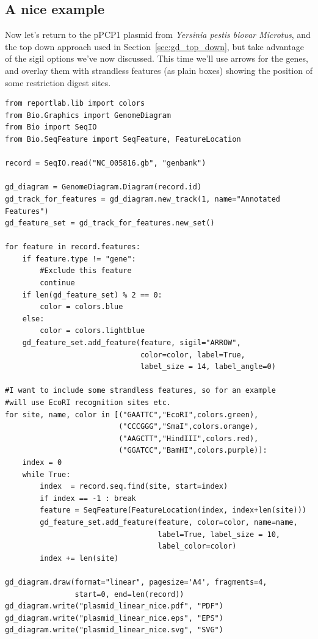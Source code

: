 \documentclass{report}
\begin{document}
\subsection{A nice example}
\label{sec:gd_nice_example}

Now let's return to the pPCP1 plasmid from \textit{Yersinia pestis biovar
Microtus}, and the top down approach used in Section~\ref{sec:gd_top_down},
but take advantage of the sigil options we've now discussed.  This time
we'll use arrows for the genes, and overlay them with strandless features
(as plain boxes) showing the position of some restriction digest sites.

\begin{verbatim}
from reportlab.lib import colors
from Bio.Graphics import GenomeDiagram
from Bio import SeqIO
from Bio.SeqFeature import SeqFeature, FeatureLocation

record = SeqIO.read("NC_005816.gb", "genbank")

gd_diagram = GenomeDiagram.Diagram(record.id)
gd_track_for_features = gd_diagram.new_track(1, name="Annotated Features")
gd_feature_set = gd_track_for_features.new_set()

for feature in record.features:
    if feature.type != "gene":
        #Exclude this feature
        continue
    if len(gd_feature_set) % 2 == 0:
        color = colors.blue
    else:
        color = colors.lightblue
    gd_feature_set.add_feature(feature, sigil="ARROW",
                               color=color, label=True,
                               label_size = 14, label_angle=0)

#I want to include some strandless features, so for an example
#will use EcoRI recognition sites etc.
for site, name, color in [("GAATTC","EcoRI",colors.green),
                          ("CCCGGG","SmaI",colors.orange),
                          ("AAGCTT","HindIII",colors.red),
                          ("GGATCC","BamHI",colors.purple)]:
    index = 0
    while True:
        index  = record.seq.find(site, start=index)
        if index == -1 : break
        feature = SeqFeature(FeatureLocation(index, index+len(site)))
        gd_feature_set.add_feature(feature, color=color, name=name,
                                   label=True, label_size = 10,
                                   label_color=color)
        index += len(site)

gd_diagram.draw(format="linear", pagesize='A4', fragments=4,
                start=0, end=len(record))
gd_diagram.write("plasmid_linear_nice.pdf", "PDF")
gd_diagram.write("plasmid_linear_nice.eps", "EPS")
gd_diagram.write("plasmid_linear_nice.svg", "SVG")
\end{verbatim}
\end{document}
